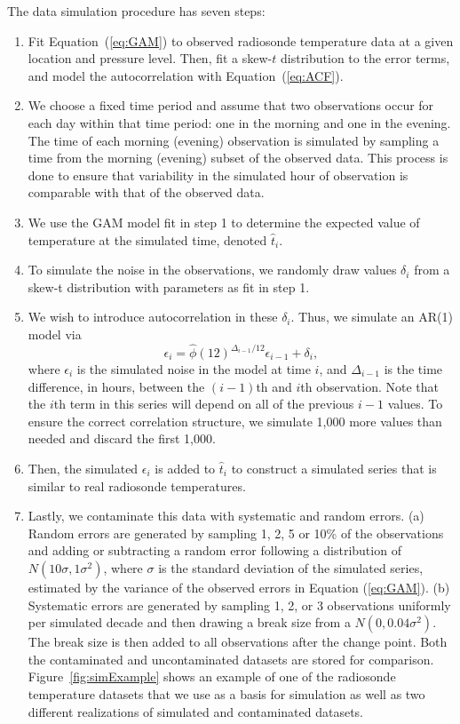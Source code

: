 \documentclass[12pt]{article}
\begin{document}
\begin{doublespacing}
The data simulation procedure has seven steps:
\begin{enumerate}
	\item Fit Equation~(\ref{eq:GAM}) to observed radiosonde temperature data at a given location and pressure level.  Then, fit a skew-$t$ distribution to the error terms, and model the autocorrelation with Equation~(\ref{eq:ACF}).
	\item We choose a fixed time period and assume that two observations occur for each day within that time period: one in the morning and one in the evening.  The time of each morning (evening) observation is simulated by sampling a time from the morning (evening) subset of the observed data.  This process is done to ensure that variability in the simulated hour of observation is comparable with that of the observed data.
	\item We use the GAM model fit in step 1 to determine the expected value of temperature at the simulated time, denoted $\hat t_i$.
	\item To simulate the noise in the observations, we randomly draw values $\delta_i$ from a skew-t distribution with parameters as fit in step 1.
	\item We wish to introduce autocorrelation in these $\delta_i$.  Thus, we simulate an AR(1) model via
	\begin{equation*}
	\epsilon_i = \widehat{\phi}(12)^{\Delta_{i-1}/12} \epsilon_{i-1} + \delta_i,
	\end{equation*}
	where $\epsilon_i$ is the simulated noise in the model at time $i$, and $\Delta_{i-1}$ is the time difference, in hours, between the $(i-1)$th and $i$th observation.  Note that the $i$th term in this series will depend on all of the previous $i-1$ values.  To ensure the correct correlation structure, we simulate 1,000 more values than needed and discard the first 1,000.
	\item Then, the simulated $\epsilon_i$ is added to $\hat{t}_i$ to construct a simulated series that is similar to real radiosonde temperatures.
	
	\item Lastly, we contaminate this data with systematic and random errors.  (a) Random errors are generated by sampling 1, 2, 5 or 10\% of the observations and adding or subtracting a random error following a distribution of $N(10\sigma,1\sigma^2)$, where $\sigma$ is the standard deviation of the simulated series, estimated by the variance of the observed errors in Equation (\ref{eq:GAM}).  (b) Systematic errors are generated by sampling 1, 2, or 3 observations uniformly per simulated decade and then drawing a break size from a $N(0,0.04 \sigma^2)$.  The break size is then added to all observations after the change point.  Both the contaminated and uncontaminated datasets are stored for comparison.  Figure~\ref{fig:simExample} shows an example of one of the radiosonde temperature datasets that we use as a basis for simulation as well as two different realizations of simulated and contaminated datasets.
\end{enumerate}


\end{doublespacing}
\end{document}
